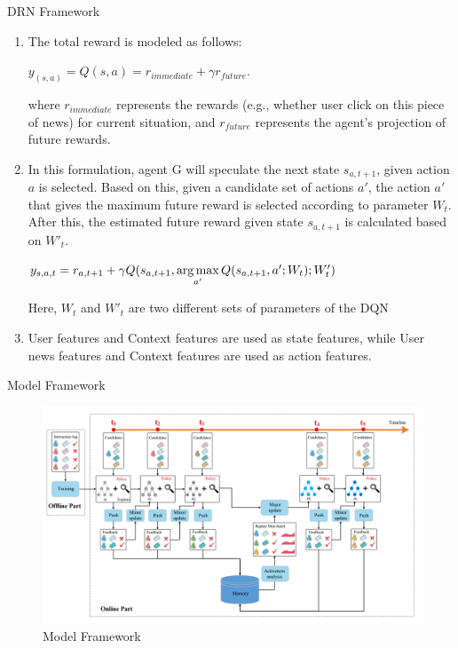 \begin{frame}{DRN Framework \cite{10.1145/3178876.3185994}}
\begin{enumerate}
    \item The total reward is modeled as follows:
    \begin{center}
        $y_{(s,a)} = Q(s, a) = r_{immediate} + \gamma r_{future}$.    
    \end{center}
    where $r_{immediate}$ represents the rewards (e.g., whether user click on this piece of news) for current situation, and $r_{future}$ represents the agent’s projection of future rewards.
    
    \item In this formulation, agent G will speculate the next state $s_{a,t+1}$, given action $a$ is selected. Based on this, given a candidate set of actions {$a'$}, the action $a'$ that gives the maximum future reward is selected according to parameter $W_t$. After this, the estimated future reward given state $s_{a,t+1}$ is calculated based on $W′_t$.
    \begin{center}
        $y_{s,a,t} = r_{a,t+1} + \gamma Q(s_{a,t+1}, \operatorname*{arg\,max}\limits_{a'} Q(s_{a,t+1}, a'; W_t ); W'_t)$
    \end{center}
    Here, $W_t$ and $W'_t$ are two different sets of parameters of the DQN
    
    \item User features and Context features are used as state features, while User news features and Context features are used as action features.
    
\end{enumerate}
\end{frame}

\begin{frame}{Model Framework}
        \begin{figure}
            \centering
            \includegraphics[scale = 0.25]{PPT/model_framework.png}
            \caption{Model Framework}
        \end{figure}
\end{frame}